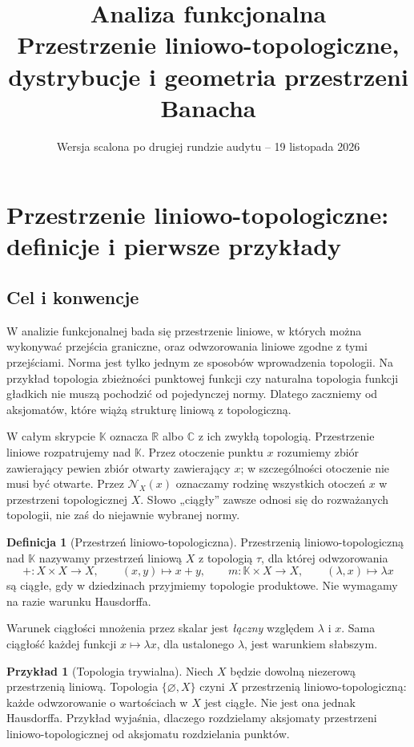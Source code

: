 \documentclass[11pt,a4paper]{article}
\title{Analiza funkcjonalna\\\large Przestrzenie liniowo-topologiczne, dystrybucje i geometria przestrzeni Banacha}
\author{}
\date{Wersja scalona po drugiej rundzie audytu -- 19 listopada 2026}
\numberwithin{equation}{section}
\theoremstyle{plain}
\theoremstyle{definition}
\newtheorem{definicja}[twierdzenie]{Definicja}
\newtheorem{przyklad}[twierdzenie]{Przykład}
\theoremstyle{remark}
\newcommand{\R}{\mathbb R}
\newcommand{\C}{\mathbb C}
\newcommand{\K}{\mathbb K}
\begin{document}
\maketitle
\tableofcontents
\bigskip
\section{Przestrzenie liniowo-topologiczne: definicje i pierwsze przykłady}\label{sec:tvs}

\subsection{Cel i konwencje}

W analizie funkcjonalnej bada się przestrzenie liniowe, w których można
wykonywać przejścia graniczne, oraz odwzorowania liniowe zgodne z tymi
przejściami. Norma jest tylko jednym ze sposobów wprowadzenia topologii.
Na przykład topologia zbieżności punktowej funkcji czy naturalna topologia
funkcji gładkich nie muszą pochodzić od pojedynczej normy. Dlatego zaczniemy
od aksjomatów, które wiążą strukturę liniową z topologiczną.

W całym skrypcie $\K$ oznacza $\R$ albo $\C$ z ich zwykłą topologią.
Przestrzenie liniowe rozpatrujemy nad $\K$. Przez otoczenie punktu $x$
rozumiemy zbiór zawierający pewien zbiór otwarty zawierający $x$;
w szczególności otoczenie nie musi być otwarte. Przez $\mathcal N_X(x)$
oznaczamy rodzinę wszystkich otoczeń $x$ w przestrzeni topologicznej $X$.
Słowo „ciągły” zawsze odnosi się do rozważanych topologii, nie zaś
do niejawnie wybranej normy.

\begin{definicja}[Przestrzeń liniowo-topologiczna]\label{def:tvs}
Przestrzenią liniowo-topologiczną nad $\K$ nazywamy przestrzeń liniową
$X$ z topologią $\tau$, dla której odwzorowania
\[
 +\colon X\times X\longrightarrow X,\qquad (x,y)\longmapsto x+y,
 \qquad
 m\colon\K\times X\longrightarrow X,\qquad (\lambda,x)\longmapsto\lambda x
\]
są ciągłe, gdy w dziedzinach przyjmiemy topologie produktowe.
Nie wymagamy na razie warunku Hausdorffa.
\end{definicja}

Warunek ciągłości mnożenia przez skalar jest \emph{łączny} względem
$\lambda$ i $x$. Sama ciągłość każdej funkcji $x\mapsto\lambda x$,
dla ustalonego $\lambda$, jest warunkiem słabszym.

\begin{przyklad}[Topologia trywialna]
Niech $X$ będzie dowolną niezerową przestrzenią liniową.
Topologia $\{\varnothing,X\}$ czyni $X$ przestrzenią
liniowo-topologiczną: każde odwzorowanie o wartościach w $X$ jest
ciągłe. Nie jest ona jednak Hausdorffa. Przykład wyjaśnia,
dlaczego rozdzielamy aksjomaty przestrzeni liniowo-topologicznej
od aksjomatu rozdzielania punktów.
\end{przyklad}
\end{document}
